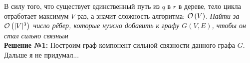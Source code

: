 \begin{algorithmic}
	\EndWhile
\EndProcedure
\end{algorithmic}
В силу того, что существует единственный путь из $q$ в $r$ в дереве, тело цикла отработает максимум $V$ раз, а значит сложность алгоритма: $\mathcal{O}\left(V\right)$. \xqed
{}
\textit{Найти за $\mathcal{O}\left(|V|^3\right)$ число рёбер, которые нужно добавить к графу $G(V,E)$, чтобы он стал сильно связным}\\
\textbf{Решение №1:} Построим граф компонент сильной связности данного графа $G$. Дальше я не придумал...

